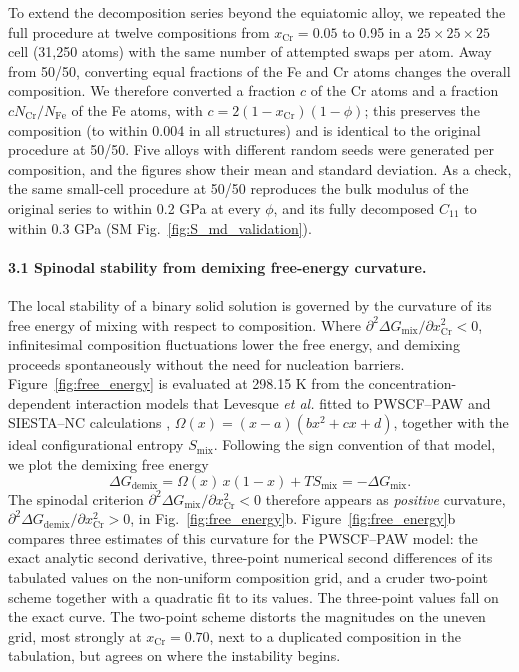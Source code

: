 \documentclass[final,3p,times]{elsarticle}
\begin{document}
To extend the decomposition series beyond the equiatomic alloy, we repeated the full procedure at twelve compositions from $x_{\mathrm{Cr}}=0.05$ to 0.95 in a $25\times25\times25$ cell (31,250 atoms) with the same number of attempted swaps per atom. Away from 50/50, converting equal fractions of the Fe and Cr atoms changes the overall composition. We therefore converted a fraction $c$ of the Cr atoms and a fraction $cN_{\mathrm{Cr}}/N_{\mathrm{Fe}}$ of the Fe atoms, with $c=2(1-x_{\mathrm{Cr}})(1-\phi)$; this preserves the composition (to within 0.004 in all structures) and is identical to the original procedure at 50/50. Five alloys with different random seeds were generated per composition, and the figures show their mean and standard deviation. As a check, the same small-cell procedure at 50/50 reproduces the bulk modulus of the original series to within 0.2 GPa at every $\phi$, and its fully decomposed $C_{11}$ to within 0.3 GPa (SM Fig.~\ref{fig:S_md_validation}).

\paragraph{3.1 Spinodal stability from demixing free-energy curvature.}

The local stability of a binary solid solution is governed by the curvature of its free energy of mixing with respect to composition. Where $\partial^2 \Delta G_{\mathrm{mix}}/\partial x_{\mathrm{Cr}}^2 < 0$, infinitesimal composition fluctuations lower the free energy, and demixing proceeds spontaneously without the need for nucleation barriers. Figure~\ref{fig:free_energy} is evaluated at 298.15 K from the concentration-dependent interaction models that Levesque \textit{et al.} fitted to PWSCF--PAW and SIESTA--NC calculations \cite{levesque2011simple}, $\Omega(x)=(x-a)(bx^2+cx+d)$, together with the ideal configurational entropy $S_{\mathrm{mix}}$. Following the sign convention of that model, we plot the demixing free energy
\begin{equation*}
\Delta G_{\mathrm{demix}} = \Omega(x)\,x(1-x) + T S_{\mathrm{mix}} = -\Delta G_{\mathrm{mix}}.
\end{equation*}
The spinodal criterion $\partial^2 \Delta G_{\mathrm{mix}}/\partial x_{\mathrm{Cr}}^2 < 0$ therefore appears as \emph{positive} curvature, $\partial^2 \Delta G_{\mathrm{demix}}/\partial x_{\mathrm{Cr}}^2 > 0$, in Fig.~\ref{fig:free_energy}b. Figure~\ref{fig:free_energy}b compares three estimates of this curvature for the PWSCF--PAW model: the exact analytic second derivative, three-point numerical second differences of its tabulated values on the non-uniform composition grid, and a cruder two-point scheme together with a quadratic fit to its values. The three-point values fall on the exact curve. The two-point scheme distorts the magnitudes on the uneven grid, most strongly at $x_{\mathrm{Cr}}=0.70$, next to a duplicated composition in the tabulation, but agrees on where the instability begins.
\end{document}
